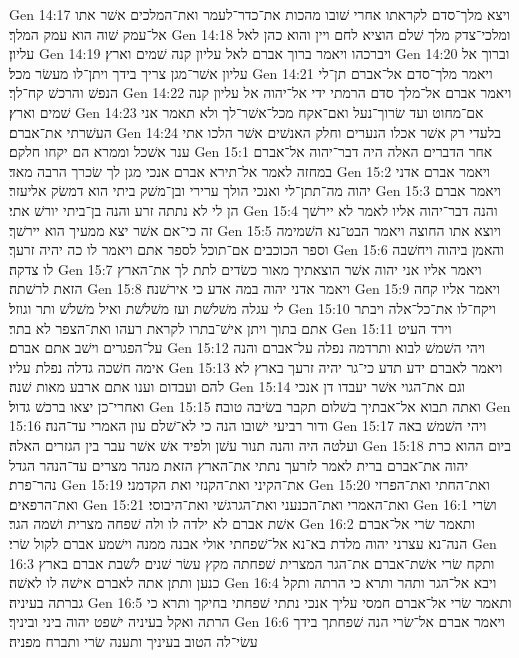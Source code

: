 Gen 14:17  ויצא מלך־סדם לקראתו אחרי שׁובו מהכות את־כדר־לעמר ואת־המלכים אשׁר אתו אל־עמק שׁוה הוא עמק המלך׃
Gen 14:18  ומלכי־צדק מלך שׁלם הוציא לחם ויין והוא כהן לאל עליון׃
Gen 14:19  ויברכהו ויאמר ברוך אברם לאל עליון קנה שׁמים וארץ׃
Gen 14:20  וברוך אל עליון אשׁר־מגן צריך בידך ויתן־לו מעשׂר מכל׃
Gen 14:21  ויאמר מלך־סדם אל־אברם תן־לי הנפשׁ והרכשׁ קח־לך׃
Gen 14:22  ויאמר אברם אל־מלך סדם הרמתי ידי אל־יהוה אל עליון קנה שׁמים וארץ׃
Gen 14:23  אם־מחוט ועד שׂרוך־נעל ואם־אקח מכל־אשׁר־לך ולא תאמר אני העשׁרתי את־אברם׃
Gen 14:24  בלעדי רק אשׁר אכלו הנערים וחלק האנשׁים אשׁר הלכו אתי ענר אשׁכל וממרא הם יקחו חלקם׃
Gen 15:1  אחר הדברים האלה היה דבר־יהוה אל־אברם במחזה לאמר אל־תירא אברם אנכי מגן לך שׂכרך הרבה מאד׃
Gen 15:2  ויאמר אברם אדני יהוה מה־תתן־לי ואנכי הולך ערירי ובן־משׁק ביתי הוא דמשׂק אליעזר׃
Gen 15:3  ויאמר אברם הן לי לא נתתה זרע והנה בן־ביתי יורשׁ אתי׃
Gen 15:4  והנה דבר־יהוה אליו לאמר לא יירשׁך זה כי־אם אשׁר יצא ממעיך הוא יירשׁך׃
Gen 15:5  ויוצא אתו החוצה ויאמר הבט־נא השׁמימה וספר הכוכבים אם־תוכל לספר אתם ויאמר לו כה יהיה זרעך׃
Gen 15:6  והאמן ביהוה ויחשׁבה לו צדקה׃
Gen 15:7  ויאמר אליו אני יהוה אשׁר הוצאתיך מאור כשׂדים לתת לך את־הארץ הזאת לרשׁתה׃
Gen 15:8  ויאמר אדני יהוה במה אדע כי אירשׁנה׃
Gen 15:9  ויאמר אליו קחה לי עגלה משׁלשׁת ועז משׁלשׁת ואיל משׁלשׁ ותר וגוזל׃
Gen 15:10  ויקח־לו את־כל־אלה ויבתר אתם בתוך ויתן אישׁ־בתרו לקראת רעהו ואת־הצפר לא בתר׃
Gen 15:11  וירד העיט על־הפגרים וישׁב אתם אברם׃
Gen 15:12  ויהי השׁמשׁ לבוא ותרדמה נפלה על־אברם והנה אימה חשׁכה גדלה נפלת עליו׃
Gen 15:13  ויאמר לאברם ידע תדע כי־גר יהיה זרעך בארץ לא להם ועבדום וענו אתם ארבע מאות שׁנה׃
Gen 15:14  וגם את־הגוי אשׁר יעבדו דן אנכי ואחרי־כן יצאו ברכשׁ גדול׃
Gen 15:15  ואתה תבוא אל־אבתיך בשׁלום תקבר בשׂיבה טובה׃
Gen 15:16  ודור רביעי ישׁובו הנה כי לא־שׁלם עון האמרי עד־הנה׃
Gen 15:17  ויהי השׁמשׁ באה ועלטה היה והנה תנור עשׁן ולפיד אשׁ אשׁר עבר בין הגזרים האלה׃
Gen 15:18  ביום ההוא כרת יהוה את־אברם ברית לאמר לזרעך נתתי את־הארץ הזאת מנהר מצרים עד־הנהר הגדל נהר־פרת׃
Gen 15:19  את־הקיני ואת־הקנזי ואת הקדמני׃
Gen 15:20  ואת־החתי ואת־הפרזי ואת־הרפאים׃
Gen 15:21  ואת־האמרי ואת־הכנעני ואת־הגרגשׁי ואת־היבוסי׃
Gen 16:1  ושׂרי אשׁת אברם לא ילדה לו ולה שׁפחה מצרית ושׁמה הגר׃
Gen 16:2  ותאמר שׂרי אל־אברם הנה־נא עצרני יהוה מלדת בא־נא אל־שׁפחתי אולי אבנה ממנה וישׁמע אברם לקול שׂרי׃
Gen 16:3  ותקח שׂרי אשׁת־אברם את־הגר המצרית שׁפחתה מקץ עשׂר שׁנים לשׁבת אברם בארץ כנען ותתן אתה לאברם אישׁה לו לאשׁה׃
Gen 16:4  ויבא אל־הגר ותהר ותרא כי הרתה ותקל גברתה בעיניה׃
Gen 16:5  ותאמר שׂרי אל־אברם חמסי עליך אנכי נתתי שׁפחתי בחיקך ותרא כי הרתה ואקל בעיניה ישׁפט יהוה ביני וביניך׃
Gen 16:6  ויאמר אברם אל־שׂרי הנה שׁפחתך בידך עשׂי־לה הטוב בעיניך ותענה שׂרי ותברח מפניה׃
